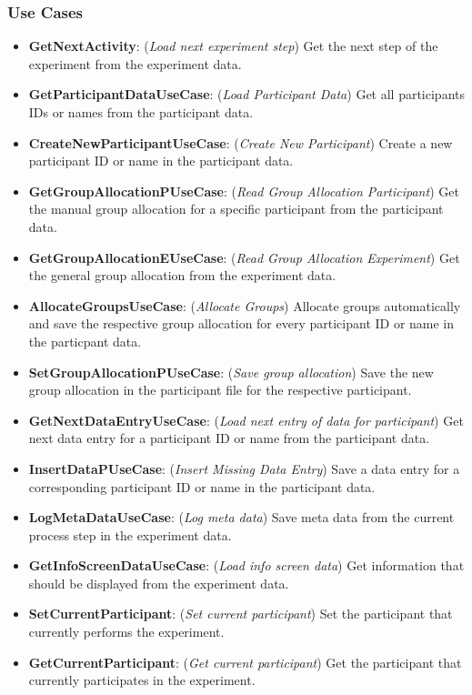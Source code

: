 \subsubsection*{Use Cases}
\begin{itemize}
    \item \textbf{GetNextActivity}: (\textit{Load next experiment step}) Get the next step of the experiment from the experiment data.
    \item \textbf{GetParticipantDataUseCase}: (\textit{Load Participant Data}) Get all participants IDs or names from the participant data. 
    \item \textbf{CreateNewParticipantUseCase}: (\textit{Create New Participant}) Create a new participant ID or name in the participant data.
    \item \textbf{GetGroupAllocationPUseCase}: (\textit{Read Group Allocation Participant}) Get the manual group allocation for a specific participant from the participant data.
    \item \textbf{GetGroupAllocationEUseCase}: (\textit{Read Group Allocation Experiment}) Get the general group allocation from the experiment data.
    \item \textbf{AllocateGroupsUseCase}: (\textit{Allocate Groups}) Allocate groups automatically and save the respective group allocation for every participant ID or name in the particpant data. 
    \item \textbf{SetGroupAllocationPUseCase}: (\textit{Save group allocation}) Save the new group allocation in the participant file for the respective participant.
    \item \textbf{GetNextDataEntryUseCase}: (\textit{Load next entry of data for participant}) Get next data entry for a participant ID or name from the participant data. 
    \item \textbf{InsertDataPUseCase}: (\textit{Insert Missing Data Entry}) Save a data entry for a corresponding participant ID or name in the participant data.
    \item \textbf{LogMetaDataUseCase}: (\textit{Log meta data}) Save meta data from the current process step in the experiment data.
    \item \textbf{GetInfoScreenDataUseCase}: (\textit{Load info screen data}) Get information that should be displayed from the experiment data.  
    \item \textbf{SetCurrentParticipant}: (\textit{Set current participant}) Set the participant that currently performs the experiment.  
    \item \textbf{GetCurrentParticipant}: (\textit{Get current participant}) Get the participant that currently participates in the experiment.  
\end{itemize}